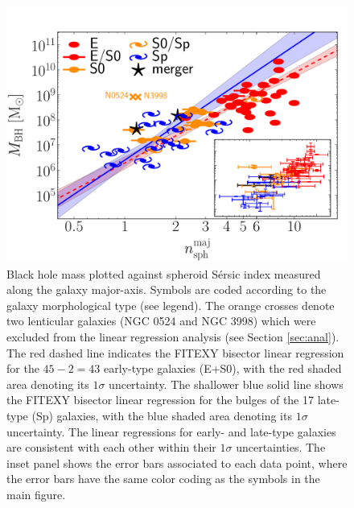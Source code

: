 \documentclass[preprint2]{emulateapj}
\begin{document}
\begin{figure}[h]
\begin{center}
\includegraphics[width=\columnwidth]{images/mbh_vs_n_maj.pdf}
\caption{Black hole mass plotted against spheroid S\'ersic index measured along the galaxy major-axis. 
Symbols are coded according to the galaxy morphological type (see legend). 
The orange crosses denote two lenticular galaxies (NGC 0524 and NGC 3998) which were excluded from the linear regression analysis 
(see Section \ref{sec:anal}). 
The red dashed line indicates the FITEXY bisector linear regression for the $45-2=43$  early-type galaxies (E+S0), 
with the red shaded area denoting its $1\sigma$ uncertainty. 
The shallower blue solid line shows the FITEXY bisector linear regression for the bulges of the 17 late-type (Sp) galaxies, 
with the blue shaded area denoting its $1\sigma$ uncertainty. 
The linear regressions for early- and late-type galaxies are consistent with each other within their $1\sigma$ uncertainties.  
The inset panel shows the error bars associated to each data point,  
where the error bars have the same color coding as the symbols in the main figure. 
}
\label{fig:mbhn}
\end{center}
\end{figure}
\end{document}
